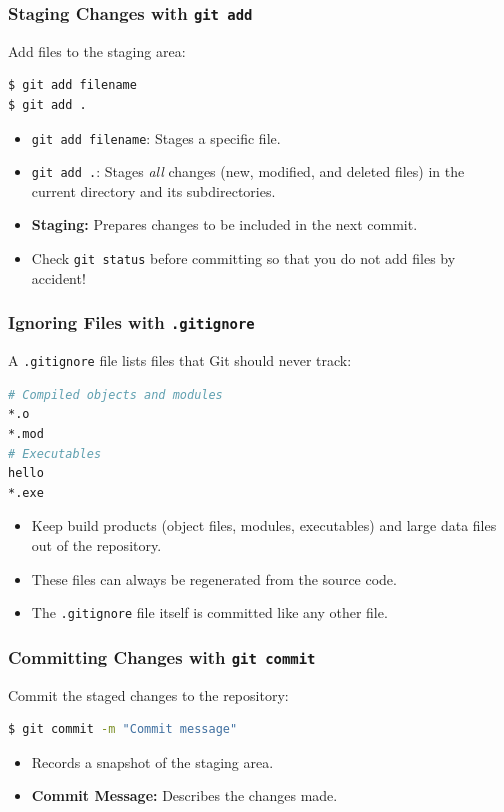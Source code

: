 \begin{frame}[fragile]
	\frametitle{Staging Changes with \texttt{git add}}
	Add files to the staging area:
\begin{lstlisting}[language=bash]
$ git add filename
$ git add .
\end{lstlisting}
	\begin{itemize}
		\item \texttt{git add filename}: Stages a specific file.
		\item \texttt{git add .}: Stages \emph{all} changes (new, modified, and deleted files) in the current directory and its subdirectories.
		\item \textbf{Staging:} Prepares changes to be included in the next commit.
		\item Check \texttt{git status} before committing so that you do not add files by accident!
	\end{itemize}
\end{frame}

\begin{frame}[fragile]
	\frametitle{Ignoring Files with \texttt{.gitignore}}
	A \texttt{.gitignore} file lists files that Git should never track:
\begin{lstlisting}[language=bash]
# Compiled objects and modules
*.o
*.mod
# Executables
hello
*.exe
\end{lstlisting}
	\begin{itemize}
		\item Keep build products (object files, modules, executables) and large data files out of the repository.
		\item These files can always be regenerated from the source code.
		\item The \texttt{.gitignore} file itself is committed like any other file.
	\end{itemize}
\end{frame}

\begin{frame}[fragile]
	\frametitle{Committing Changes with \texttt{git commit}}
	Commit the staged changes to the repository:
\begin{lstlisting}[language=bash]
$ git commit -m "Commit message"
\end{lstlisting}
	\begin{itemize}
		\item Records a snapshot of the staging area.
		\item \textbf{Commit Message:} Describes the changes made.
	\end{itemize}
\end{frame}

